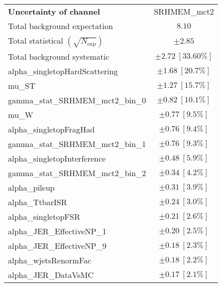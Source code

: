 
\begin{table}
\begin{center}
\setlength{\tabcolsep}{0.0pc}
\begin{tabular*}{\textwidth}{@{\extracolsep{\fill}}lc}
\noalign{\smallskip}\hline\noalign{\smallskip}
{\textbf{Uncertainty of channel}}                                    & SRHMEM\_mct2            \\
\noalign{\smallskip}\hline\noalign{\smallskip}
Total background expectation             &  $8.10$       \\
\noalign{\smallskip}\hline\noalign{\smallskip}
Total statistical $(\sqrt{N_{\mathrm{exp}}})$              & $\pm 2.85$       \\
Total background systematic               & $\pm 2.72\ [33.60\%] $             \\
\noalign{\smallskip}\hline\noalign{\smallskip}
\noalign{\smallskip}\hline\noalign{\smallskip}
alpha\_singletopHardScattering         & $\pm 1.68\ [20.7\%] $       \\
mu\_ST         & $\pm 1.27\ [15.7\%] $       \\
gamma\_stat\_SRHMEM\_mct2\_bin\_0         & $\pm 0.82\ [10.1\%] $       \\
mu\_W         & $\pm 0.77\ [9.5\%] $       \\
alpha\_singletopFragHad         & $\pm 0.76\ [9.4\%] $       \\
gamma\_stat\_SRHMEM\_mct2\_bin\_1         & $\pm 0.76\ [9.3\%] $       \\
alpha\_singletopInterference         & $\pm 0.48\ [5.9\%] $       \\
gamma\_stat\_SRHMEM\_mct2\_bin\_2         & $\pm 0.34\ [4.2\%] $       \\
alpha\_pileup         & $\pm 0.31\ [3.9\%] $       \\
alpha\_TtbarISR         & $\pm 0.24\ [3.0\%] $       \\
alpha\_singletopFSR         & $\pm 0.21\ [2.6\%] $       \\
alpha\_JER\_EffectiveNP\_1         & $\pm 0.20\ [2.5\%] $       \\
alpha\_JER\_EffectiveNP\_9         & $\pm 0.18\ [2.3\%] $       \\
alpha\_wjetsRenormFac         & $\pm 0.18\ [2.2\%] $       \\
alpha\_JER\_DataVsMC         & $\pm 0.17\ [2.1\%] $       \\

\end{tabular*}
\end{center}
\end{table}
